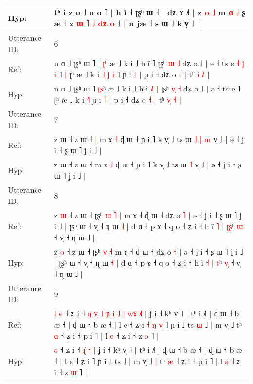\documentclass[10pt]{article}
\DeclareRobustCommand{\hl}[1]{{\textcolor{red}{#1}}}
\begin{document}
\begin{longtable}{ll}
 \\
Hyp: & tʰ i\hl{}\hl{}\hl{}\hl{}\hl{} z o ˩ n o ˥ | h ĩ ˧ ʈʂʰ ɯ ˧ | dʑ ɤ ˩˥ | z \hl{o} \hl{˩} m \hl{ɑ} \hl{˩} ʂ æ ˧ z\hl{}\hl{} \hl{ɯ} \hl{˥} \hl{˩} \hl{}\hl{d}\hl{ʑ} \hl{o} ˩ | n jæ ˧ s ɯ ˩ k v̩ ˩ |
 \\
\midrule
Utterance ID: & 6 \\
Ref: & n ɑ ˩ ʈʂʰ ɯ ˥ \hl{|}\hl{ }\hl{ʈ}ʰ æ ˩ k i ˩ h ĩ \hl{}˥\hl{}\hl{} ʈʂʰ \hl{}\hl{ɯ} \hl{˩} dʑ o ˩ | ə ˧ ts e\hl{ }\hl{˧}\hl{ }\hl{ʝ}\hl{ }\hl{i} ˥\hl{ }\hl{|} ʈʰ æ ˩ k i\hl{ }\hl{˩}\hl{ }\hl{ʝ} \hl{i}\hl{ }˥ ɲ i \hl{˩} | p i ˧ dʑ o \hl{˩} | tʰ \hl{i}\hl{ }\hl{˩}\hl{˥} |
 \\
Hyp: & n ɑ ˩ ʈʂʰ ɯ ˥ \hl{}\hl{ʈ}\hl{ʂ}ʰ æ ˩ k i ˩ h ĩ \hl{˩}˥\hl{ }\hl{|} ʈʂʰ \hl{v}\hl{̩} \hl{˧} dʑ o ˩ | ə ˧ ts e\hl{}\hl{}\hl{}\hl{}\hl{}\hl{} ˥\hl{}\hl{} ʈʰ æ ˩ k i\hl{}\hl{}\hl{}\hl{} \hl{}\hl{˧}˥ ɲ i \hl{˥} | p i ˧ dʑ o \hl{˧} | tʰ \hl{v}\hl{̩}\hl{ }\hl{˧} |
 \\
\midrule
Utterance ID: & 7 \\
Ref: & z ɯ ˧ z ɯ ˧\hl{ }\hl{|} m ɤ \hl{˧} ɖ ɯ ˧ ɲ i ˥ k v̩ ˩ ts ɯ\hl{ }\hl{˩}\hl{ }\hl{|} \hl{m} v̩ ˩ | ə ˧ ʝ i ˧ ʂ ɯ ˥ ʝ i ˩ |
 \\
Hyp: & z ɯ ˧ z ɯ ˧\hl{}\hl{} m ɤ \hl{˩} ɖ ɯ ˧ ɲ i ˥ k v̩ ˩ ts ɯ\hl{}\hl{}\hl{}\hl{} \hl{˥} v̩ ˩ | ə ˧ ʝ i ˧ ʂ ɯ ˥ ʝ i ˩ |
 \\
\midrule
Utterance ID: & 8 \\
Ref: & z \hl{ɯ} ˧ z ɯ ˧ ʈʂʰ \hl{ɯ}\hl{ }\hl{˥} \hl{|} m ɤ ˧ ɖ ɯ ˧ dʑ o \hl{˥} | ə ˧ ʝ i ˧ ʂ ɯ ˥ ʝ i ˩ | ʈʂʰ ɯ ˧ v̩ ˧ ɳ ɯ \hl{˩} | d ɑ ˧ p ɤ ˧ q o ˧ ʑ i ˧ h ĩ \hl{˥} | \hl{ʈ}\hl{ʂ}ʰ \hl{}\hl{ɯ} ˧ v̩ ˧ ɳ ɯ ˩ |
 \\
Hyp: & z \hl{o} ˧ z ɯ ˧ ʈʂʰ \hl{}\hl{v}\hl{̩} \hl{˧} m ɤ ˧ ɖ ɯ ˧ dʑ o \hl{˧} | ə ˧ ʝ i ˧ ʂ ɯ ˥ ʝ i ˩ | ʈʂʰ ɯ ˧ v̩ ˧ ɳ ɯ \hl{˧} | d ɑ ˧ p ɤ ˧ q o ˧ ʑ i ˧ h ĩ \hl{˧} | \hl{}\hl{t}ʰ \hl{v}\hl{̩} ˧ v̩ ˧ ɳ ɯ ˩ |
 \\
\midrule
Utterance ID: & 9 \\
Ref: & \hl{l}\hl{ }\hl{e} ˧ ʑ i ˧\hl{ }\hl{ŋ}\hl{ }\hl{v}\hl{̩}\hl{ }\hl{˥}\hl{ }\hl{ɲ}\hl{ }\hl{i}\hl{ }\hl{˩}\hl{ }\hl{|} \hl{w}\hl{ɤ} \hl{˩}\hl{˥} | ʝ i ˧ kʰ v̩ ˥ | tʰ i ˩˥ | ɖ ɯ ˧ b æ ˧ | ɖ ɯ ˧ b æ ˧ | l e ˧ ʑ i\hl{ }\hl{˧}\hl{ }\hl{ŋ}\hl{ }\hl{v}\hl{̩} ˥ ɲ i ˩ ts\hl{ }\hl{ɯ} ˩ | m v̩ ˩\hl{}\hl{} tʰ \hl{ɑ} ˧ ʑ i ˧ p i ˥ | l \hl{e} ˧ ʑ i ˧ z \hl{o} ˥ |
 \\
Hyp: & \hl{}\hl{}\hl{ə} ˧ ʑ i ˧\hl{}\hl{}\hl{}\hl{}\hl{}\hl{}\hl{}\hl{}\hl{}\hl{}\hl{}\hl{}\hl{}\hl{}\hl{} \hl{ɻ}\hl{̍} \hl{}\hl{˧} | ʝ i ˧ kʰ v̩ ˥ | tʰ i ˩˥ | ɖ ɯ ˧ b æ ˧ | ɖ ɯ ˧ b æ ˧ | l e ˧ ʑ i\hl{}\hl{}\hl{}\hl{}\hl{}\hl{}\hl{} ˥ ɲ i ˩ ts\hl{}\hl{} ˩ | m v̩ ˩\hl{ }\hl{|} tʰ \hl{æ} ˧ ʑ i ˧ p i ˥ | l \hl{ə} ˧ ʑ i ˧ z \hl{ɯ} ˥ |

\end{longtable}
\end{document}
